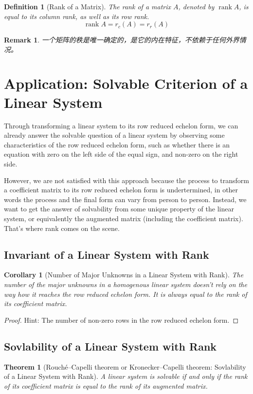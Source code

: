 \documentclass[onecolumn]{ctexart}
\newtheorem{definition}{Definition}
\newtheorem{theorem}{Theorem}
\newtheorem{corollary}{Corollary}
\newtheorem{remark}{Remark}
\DeclareMathOperator{\rank}{rank}
\begin{document}
\begin{definition}[Rank of a Matrix]
  The rank of a matrix $A$, denoted by $\rank A$, is equal to its column rank, 
  as well as its row rank.
  \[
    \rank A = r_c(A) = r_r(A)
  \]
\end{definition}
\begin{remark}
  一个矩阵的秩是唯一确定的，是它的内在特征，不依赖于任何外界情况。
\end{remark}

\section{Application: Solvable Criterion of a Linear System}

Through transforming a linear system to its row reduced echelon form, we can 
already answer the solvable question of a linear system by observing some 
characteristics of the row reduced echelon form, such as whether there is an 
equation with zero on the left side of the equal sign, and non-zero on the right 
side.

However, we are not satisfied with this approach because the process to 
transform a coefficient matrix to its row reduced echelon form is undertermined, 
in other words the process and the final form can vary from person to person. 
Instead, we want to get the answer of solvability from some unique property of 
the linear system, or equivalently the augmented matrix (including the 
coefficient matrix). That's where rank comes on the scene.

\subsection{Invariant of a Linear System with Rank}
\begin{corollary}[Number of Major Unknowns in a Linear System with Rank]
  The number of the major unknowns in a homogenous linear system doesn't rely on 
  the way how it reaches the row reduced echelon form. It is always equal to the 
  rank of its coefficient matrix.
\end{corollary}
\begin{proof}
  Hint: The number of non-zero rows in the row reduced echelon form.
\end{proof}

\subsection{Sovlability of a Linear System with Rank}
\begin{theorem}[Rouché–Capelli theorem or Kronecker–Capelli theorem: Sovlability 
of a Linear System with Rank]
  A linear system is solvable if and only if the rank of its coefficient matrix 
  is equal to the rank of its augmented matrix.
\end{theorem}
\end{document}
